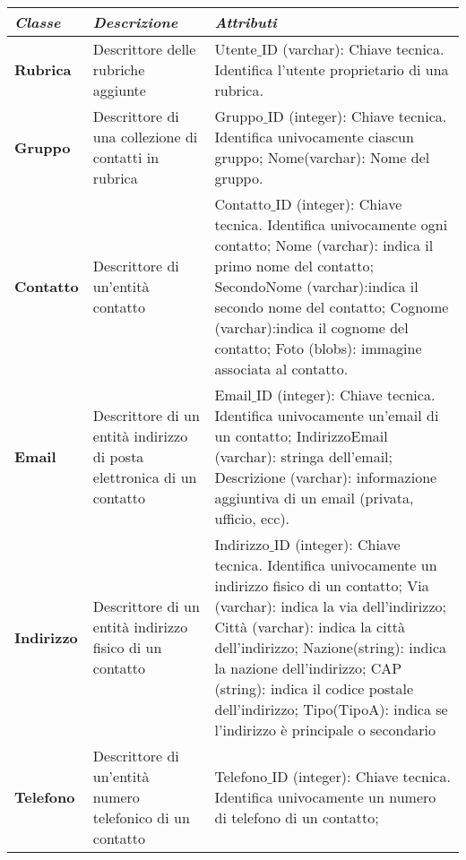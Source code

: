 \begin{longtable}{p{}p{}p{}}
\toprule
\textit{Classe} & \textit{Descrizione} & \textit{Attributi}
\\ \midrule
\endhead
\textbf{Rubrica} &
Descrittore delle rubriche aggiunte &
Utente$\_$ID (varchar): Chiave tecnica. Identifica l’utente proprietario di una rubrica. 
\\ \midrule
\textbf{Gruppo} &
Descrittore di una collezione di contatti in rubrica &
Gruppo$\_$ID (integer): Chiave tecnica. Identifica univocamente ciascun gruppo;\newline
Nome(varchar): Nome del gruppo.
\\ \midrule
\textbf{Contatto} &
Descrittore di un'entità contatto &
Contatto$\_$ID (integer): Chiave tecnica. Identifica univocamente ogni contatto;\newline
Nome (varchar): indica il primo nome del contatto;\newline
SecondoNome (varchar):indica il secondo nome del contatto;\newline
Cognome (varchar):indica il cognome del contatto;\newline
Foto (blobs): immagine associata al contatto.
\\ \midrule
\textbf{Email} &
Descrittore di un entità indirizzo di posta elettronica di un contatto &
Email$\_$ID (integer): Chiave tecnica. Identifica univocamente un'email di un contatto;\newline
IndirizzoEmail (varchar): stringa dell'email;\newline
Descrizione (varchar): informazione aggiuntiva di un email (privata, ufficio, ecc).
\\ \midrule
\textbf{Indirizzo} &
Descrittore di un entità indirizzo fisico di un contatto &
Indirizzo$\_$ID (integer): Chiave tecnica. Identifica univocamente un indirizzo fisico di un contatto; \newline
Via (varchar): indica la via dell’indirizzo;\newline
Città (varchar): indica la città dell’indirizzo;\newline
Nazione(string): indica la nazione dell’indirizzo;\newline
CAP (string): indica il codice postale dell'indirizzo;\newline
Tipo(TipoA): indica se l’indirizzo è principale o secondario
\\ \midrule
\textbf{Telefono} &
Descrittore di un'entità numero telefonico di un contatto &
Telefono$\_$ID (integer): Chiave tecnica. Identifica univocamente un numero di telefono di un contatto; \newline

\end{longtable}
